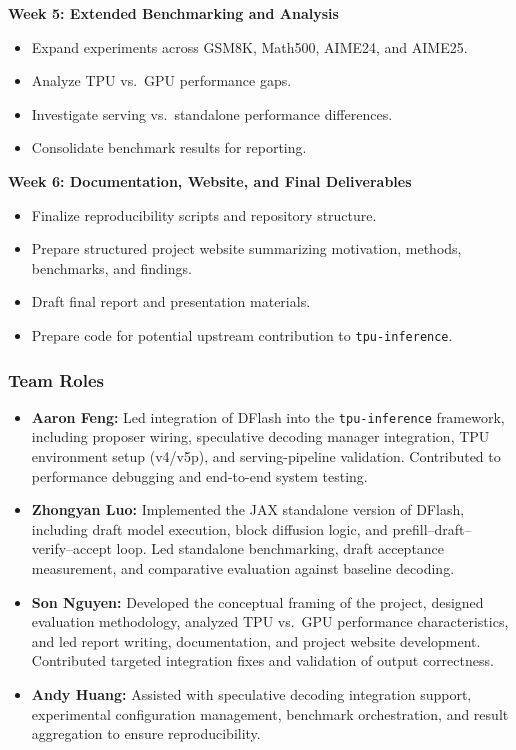 \documentclass[12pt,letterpaper]{article}
\begin{document}
\textbf{Week 5: Extended Benchmarking and Analysis}

\begin{itemize}
    \item Expand experiments across GSM8K, Math500, AIME24, and AIME25.
    \item Analyze TPU vs.\ GPU performance gaps.
    \item Investigate serving vs.\ standalone performance differences.
    \item Consolidate benchmark results for reporting.
\end{itemize}

\textbf{Week 6: Documentation, Website, and Final Deliverables}

\begin{itemize}
    \item Finalize reproducibility scripts and repository structure.
    \item Prepare structured project website summarizing motivation, methods, benchmarks, and findings.
    \item Draft final report and presentation materials.
    \item Prepare code for potential upstream contribution to \texttt{tpu-inference}.
\end{itemize}


\subsubsection*{Team Roles}

\begin{itemize}
    \item \textbf{Aaron Feng:} Led integration of DFlash into the \texttt{tpu-inference} framework, including proposer wiring, speculative decoding manager integration, TPU environment setup (v4/v5p), and serving-pipeline validation. Contributed to performance debugging and end-to-end system testing.

    \item \textbf{Zhongyan Luo:} Implemented the JAX standalone version of DFlash, including draft model execution, block diffusion logic, and prefill–draft–verify–accept loop. Led standalone benchmarking, draft acceptance measurement, and comparative evaluation against baseline decoding.

    \item \textbf{Son Nguyen:} Developed the conceptual framing of the project, designed evaluation methodology, analyzed TPU vs.\ GPU performance characteristics, and led report writing, documentation, and project website development. Contributed targeted integration fixes and validation of output correctness.

    \item \textbf{Andy Huang:} Assisted with speculative decoding integration support, experimental configuration management, benchmark orchestration, and result aggregation to ensure reproducibility.
\end{itemize}
\end{document}
